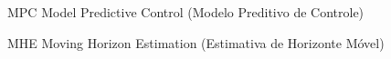 \begin{siglas}
  \item[MPC] Model Predictive Control (Modelo Preditivo de Controle)
  \item[MHE] Moving Horizon Estimation (Estimativa de Horizonte Móvel)
\end{siglas}